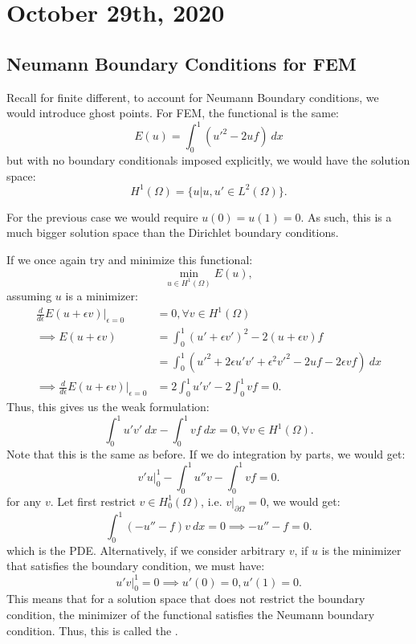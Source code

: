 \documentclass[../main/main.tex]{subfiles}
\begin{document}
\section{October 29th, 2020}
\subsection{Neumann Boundary Conditions for FEM}
Recall for finite different, to account for Neumann Boundary conditions, we would introduce ghost points. For FEM, the functional is the same: \[
    E(u) = \int^1_0(u'^2-2uf)~dx
\] but with no boundary conditionals imposed explicitly, we would have the solution space: \[
H^1(\Omega) = \{ u | u , u' \in  L^2(\Omega)\} 
.\]  
\begin{remark}
    For the previous case we would require $u(0) = u(1) = 0$. As such, this is a much bigger solution space than the Dirichlet boundary conditions.
\end{remark}
If we once again try and minimize this functional: \[
    \min_{u \in  H^1(\Omega)} E(u)
,\] assuming $u$ is a minimizer:
\begin{align*} 
\frac{d}{d\epsilon}E(u+\epsilon v)\bigg\rvert_{\epsilon = 0} &= 0, \forall v \in  H^1(\Omega)\\
    \implies E(u+\epsilon v) &= \int^1_0 (u'+\epsilon v')^2 - 2(u+\epsilon v)f\\
                             &=  \int^1_0 (u'^2+2\epsilon u'v' + \epsilon^2v'^2-2uf-2\epsilon vf)~dx\\
\implies \frac{d}{d\epsilon}E(u+\epsilon v)\bigg\rvert_{\epsilon = 0} &= 2\int^1_0 u'v' - 2\int^1_0 vf = 0
.\end{align*}
Thus, this gives us the weak formulation: \[
    \int^1_0 u'v'~dx-\int^1_0 vf~dx = 0, \forall v \in H^1(\Omega)
.\] Note that this is the same as before. If we do integration by parts, we would get: \[
v'u\bigg\rvert^1_0 - \int^1_0 u '' v - \int^1_0 vf = 0
.\] for any $v$. Let first restrict $v \in  H^1_0(\Omega)$, i.e. $v\big\rvert_{\partial \Omega} = 0$, we would get: \[
\int^1_0(-u'' - f) v ~dx = 0 \implies -u'' -f = 0
.\] which is the PDE. Alternatively, if we consider arbitrary $v$, if $u$ is the minimizer that satisfies the boundary condition, we must have:  \[
u'v\bigg\rvert^1_0 = 0 \implies u'(0) = 0, u'(1) = 0
.\]  This means that for a solution space that does not restrict the boundary condition, the minimizer of the functional satisfies the Neumann boundary condition. Thus, this is called the .\\
\end{document}
